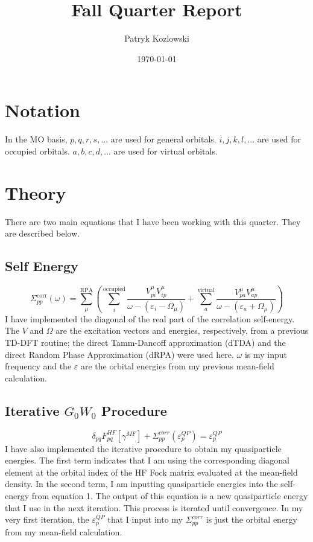 \documentclass[12pt]{article}
\author{Patryk Kozlowski}
\title{Fall Quarter Report}
\date{\today}
\begin{document}
\maketitle
\section{Notation}
In the MO basis, $p,q,r,s,...$ are used for general orbitals. $i,j,k,l,...$ are used for occupied orbitals. $a,b,c,d,...$ are used for virtual orbitals.
\section{Theory}
There are two main equations that I have been working with this quarter. They are described below.
\subsection{Self Energy}
\begin{equation}
    \Sigma_{pp}^{\text{corr}}(\omega) = \sum_{\mu }^{\text{RPA}}\left(\sum_{i}^{\text{occupied}} \frac{V_{pi}^{\mu }V_{ip}^{\mu }}{\omega -(\varepsilon _{i}-\Omega  _{\mu })}+ \sum_{a}^{\text{virtual}} \frac{V_{pa}^{\mu }V_{ap}^{\mu }}{\omega -(\varepsilon _{a}+\Omega  _{\mu })}\right)
\end{equation}
I have implemented the diagonal of the real part of the correlation self-energy. The $V$ and $\Omega$ are the excitation vectors and energies, respectively, from a previous TD-DFT routine; the direct Tamm-Dancoff approximation (dTDA) and the direct Random Phase Approximation (dRPA) were used here. $\omega$ is my input frequency and the $\varepsilon$ are the orbital energies from my previous mean-field calculation.
\subsection{Iterative $G_0W_{0}$ Procedure}
\begin{equation}
    \delta_{pq}F_{pq}^{HF}[\gamma^{MF}] + \Sigma_{pp}^{corr}(\varepsilon_{p}^{QP}) = \varepsilon_{p}^{QP}
\end{equation}
I have also implemented the iterative procedure to obtain my quasiparticle energies. The first term indicates that I am using the corresponding diagonal element at the orbital index of the HF Fock matrix evaluated at the mean-field density. In the second term, I am inputting quasiparticle energies into the self-energy from equation 1. The output of this equation is a new quasiparticle energy that I use in the next iteration. This process is iterated until convergence. In my very first iteration, the $\varepsilon_{p}^{QP}$ that I input into my $\Sigma_{pp}^{corr}$ is just the orbital energy from my mean-field calculation.
\newpage
\end{document}

